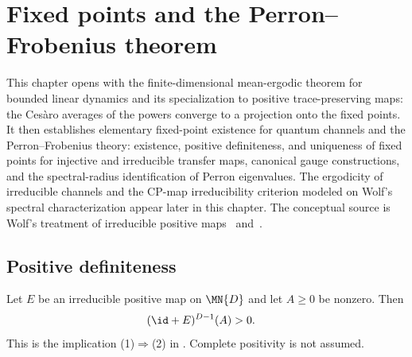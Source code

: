 \chapter{Fixed points and the Perron--Frobenius theorem}\label{ch:qpf}

This chapter opens with the finite-dimensional mean-ergodic theorem for
bounded linear dynamics and its specialization to positive trace-preserving
maps: the Ces\`aro averages of the powers converge to a projection onto the
fixed points. It then establishes elementary fixed-point existence for quantum channels
and the Perron--Frobenius theory: existence, positive definiteness, and uniqueness
of fixed points for injective and irreducible transfer maps, canonical
gauge constructions, and the
spectral-radius identification of Perron eigenvalues.
The ergodicity of irreducible channels and the CP-map
irreducibility criterion modeled on Wolf's spectral characterization appear
later in this chapter.
The conceptual source is Wolf's treatment of irreducible positive
maps~\cite[Chapter~6, especially Theorems~6.2--6.5 and Corollary~6.3]{Wolf2012Quantum}
and~\cite{Evans1978Spectral}.







\section{Positive definiteness}

\begin{theorem}
    \label{thm:growth_pd_irred}
    \leanok
    Let $E$ be an irreducible positive map on $\MN{D}$ and let
    $A\geq0$ be nonzero. Then
    \begin{align}
        (\id+E)^{D-1}(A)
         & >0.
        \label{eq:qpf_growth_pd}
    \end{align}
    This is the implication (1)$\Rightarrow$(2) in
    \cite[Theorem~6.2]{Wolf2012Quantum}. Complete positivity is not assumed.
\end{theorem}


